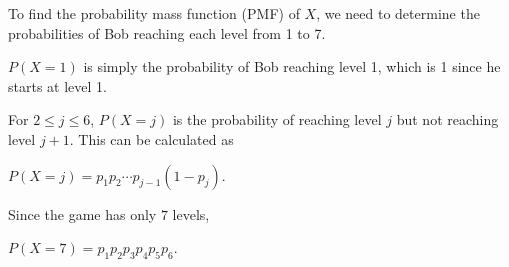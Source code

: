 To find the probability mass function (PMF) of $X$, we need to determine the probabilities of Bob reaching each level from 1 to 7.

$P(X = 1)$ is simply the probability of Bob reaching level 1, which is 1 since he starts at level 1.

For $2 \leq j \leq 6$, $P(X = j)$ is the probability of reaching level $j$ but not reaching level $j+1$. 
This can be calculated as 

$P(X = j) = p_1 p_2 \cdots p_{j-1}  (1 - p_j)$.

Since the game has only $7$ levels,

$P(X = 7) = p_1  p_2 p_3  p_4  p_5  p_6$.
